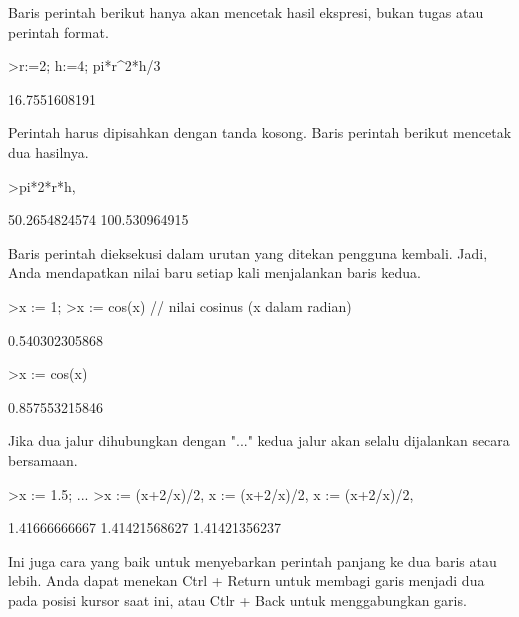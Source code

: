 \documentclass[a4paper,10pt]{article}
\begin{document}
\begin{eulernotebook}
\begin{eulercomment}
Baris perintah berikut hanya akan mencetak hasil ekspresi, bukan tugas
atau perintah format.
\end{eulercomment}
\begin{eulerprompt}
>r:=2; h:=4; pi*r^2*h/3
\end{eulerprompt}
\begin{euleroutput}
  16.7551608191
\end{euleroutput}
\begin{eulercomment}
Perintah harus dipisahkan dengan tanda kosong. Baris perintah berikut
mencetak dua hasilnya.
\end{eulercomment}
\begin{eulerprompt}
>pi*2*r*h, %
\end{eulerprompt}
\begin{euleroutput}
  50.2654824574
  100.530964915
\end{euleroutput}
\begin{eulercomment}
Baris perintah dieksekusi dalam urutan yang ditekan pengguna kembali.
Jadi, Anda mendapatkan nilai baru setiap kali menjalankan baris kedua.
\end{eulercomment}
\begin{eulerprompt}
>x := 1;
>x := cos(x) // nilai cosinus (x dalam radian)
\end{eulerprompt}
\begin{euleroutput}
  0.540302305868
\end{euleroutput}
\begin{eulerprompt}
>x := cos(x)
\end{eulerprompt}
\begin{euleroutput}
  0.857553215846
\end{euleroutput}
\begin{eulercomment}
Jika dua jalur dihubungkan dengan "..." kedua jalur akan selalu
dijalankan secara bersamaan.
\end{eulercomment}
\begin{eulerprompt}
>x := 1.5; ...
>x := (x+2/x)/2, x := (x+2/x)/2, x := (x+2/x)/2, 
\end{eulerprompt}
\begin{euleroutput}
  1.41666666667
  1.41421568627
  1.41421356237
\end{euleroutput}
\begin{eulercomment}
Ini juga cara yang baik untuk menyebarkan perintah panjang ke dua
baris atau lebih. Anda dapat menekan Ctrl + Return untuk membagi garis
menjadi dua pada posisi kursor saat ini, atau Ctlr + Back untuk
menggabungkan garis.


\end{eulercomment}
\end{eulernotebook}
\end{document}
